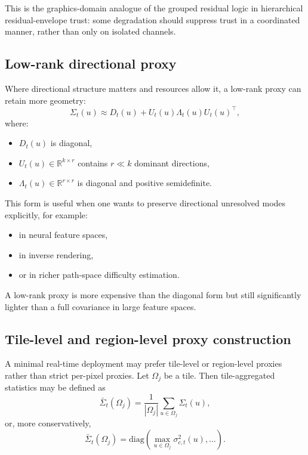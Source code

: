 \documentclass[11pt]{article}
\theoremstyle{definition}
\theoremstyle{plain}
\begin{document}
This is the graphics-domain analogue of the grouped residual logic in hierarchical residual-envelope trust: some degradation should suppress trust in a coordinated manner, rather than only on isolated channels.


\subsection{Low-rank directional proxy}

Where directional structure matters and resources allow it, a low-rank proxy can retain more geometry:
\begin{equation}
\Sigma_t(u)\approx D_t(u)+U_t(u)\Lambda_t(u)U_t(u)^\top,
\end{equation}
where:
\begin{itemize}[leftmargin=1.5em]
    \item $D_t(u)$ is diagonal,
    \item $U_t(u)\in\mathbb{R}^{k\times r}$ contains $r\ll k$ dominant directions,
    \item $\Lambda_t(u)\in\mathbb{R}^{r\times r}$ is diagonal and positive semidefinite.
\end{itemize}

This form is useful when one wants to preserve directional unresolved modes explicitly, for example:
\begin{itemize}[leftmargin=1.5em]
    \item in neural feature spaces,
    \item in inverse rendering,
    \item or in richer path-space difficulty estimation.
\end{itemize}

A low-rank proxy is more expensive than the diagonal form but still significantly lighter than a full covariance in large feature spaces.


\subsection{Tile-level and region-level proxy construction}

A minimal real-time deployment may prefer tile-level or region-level proxies rather than strict per-pixel proxies. Let $\Omega_j$ be a tile. Then tile-aggregated statistics may be defined as
\begin{equation}
\bar{\Sigma}_t(\Omega_j)=\frac{1}{|\Omega_j|}\sum_{u\in\Omega_j}\Sigma_t(u),
\end{equation}
or, more conservatively,
\begin{equation}
\bar{\Sigma}_t(\Omega_j)=\mathrm{diag}\!\left(
\max_{u\in\Omega_j}\sigma^{2}_{c,t}(u),\dots
\right).
\end{equation}
\end{document}

